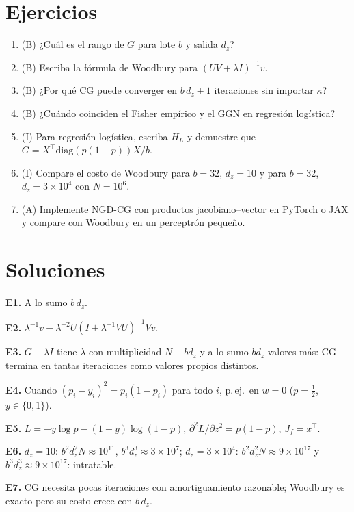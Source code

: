 \documentclass[11pt,a4paper]{article}
\begin{document}
\section{Ejercicios}
\begin{enumerate}[label=\textbf{E\arabic*.}]
\item (B) ¿Cuál es el rango de $G$ para lote $b$ y salida $d_z$?
\item (B) Escriba la fórmula de Woodbury para $(UV+\lambda I)^{-1}v$.
\item (B) ¿Por qué CG puede converger en $b\,d_z+1$ iteraciones sin importar $\kappa$?
\item (B) ¿Cuándo coinciden el Fisher empírico y el GGN en regresión logística?
\item (I) Para regresión logística, escriba $H_L$ y demuestre que $G=X^\top\mathrm{diag}(p(1-p))X/b$.
\item (I) Compare el costo de Woodbury para $b=32$, $d_z=10$ y para $b=32$, $d_z=3\times10^4$ con $N=10^6$.
\item (A) Implemente NGD-CG con productos jacobiano--vector en PyTorch o JAX y compare con Woodbury en un perceptrón pequeño.
\end{enumerate}
\section{Soluciones}
\begin{solucion}
\textbf{E1.} A lo sumo $b\,d_z$.

\textbf{E2.} $\lambda^{-1}v-\lambda^{-2}U(I+\lambda^{-1}VU)^{-1}Vv$.

\textbf{E3.} $G+\lambda I$ tiene $\lambda$ con multiplicidad $N-bd_z$ y a lo sumo $bd_z$ valores más: CG termina en tantas iteraciones como valores propios distintos.

\textbf{E4.} Cuando $(p_i-y_i)^2=p_i(1-p_i)$ para todo $i$, p.\,ej.\ en $w=0$ ($p=\frac12$, $y\in\{0,1\}$).

\textbf{E5.} $L=-y\log p-(1-y)\log(1-p)$, $\partial^2L/\partial z^2=p(1-p)$, $J_f=x^\top$.

\textbf{E6.} $d_z=10$: $b^2d_z^2N\approx10^{11}$, $b^3d_z^3\approx3\times10^7$; $d_z=3\times10^4$: $b^2d_z^2N\approx9\times10^{17}$ y $b^3d_z^3\approx9\times10^{17}$: intratable.

\textbf{E7.} CG necesita pocas iteraciones con amortiguamiento razonable; Woodbury es exacto pero su costo crece con $b\,d_z$.
\end{solucion}
\end{document}
